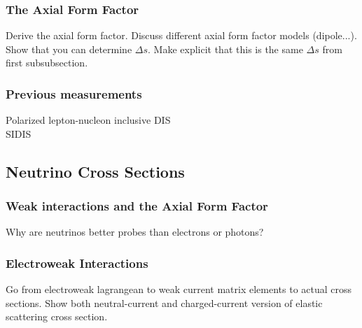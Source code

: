   \subsubsection{The Axial Form Factor}
    Derive the axial form factor. Discuss different axial form factor models
    (dipole...). Show that you can determine $\Delta s$. Make explicit that
    this is the same $\Delta s$ from first subsubsection.
  \subsubsection{Previous measurements}
    Polarized lepton-nucleon inclusive DIS \\
    SIDIS
    

  

\subsection{Neutrino Cross Sections}\label{probe}
  \subsubsection{Weak interactions and the Axial Form Factor}
    Why are neutrinos better probes than electrons or photons?
  \subsubsection{Electroweak Interactions}
    Go from electroweak lagrangean to weak current matrix elements to actual
    cross sections. Show both neutral-current and charged-current version of
    elastic scattering cross section.

